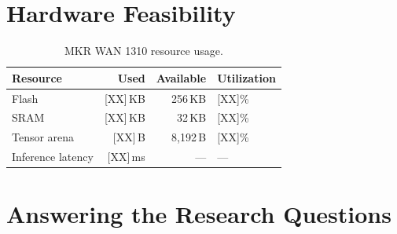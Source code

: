 

\section{Hardware Feasibility}
\label{sec:hardware-feasibility}

\begin{table}[H]
  \centering
  \caption{MKR WAN 1310 resource usage.}
  \label{tab:hw-resources}
  \begin{tabular}{lrrl}
    \toprule
    \textbf{Resource} & \textbf{Used} & \textbf{Available} & \textbf{Utilization} \\
    \midrule
    Flash              & [XX]\,KB  & 256\,KB   & [XX]\% \\
    SRAM               & [XX]\,KB  & 32\,KB    & [XX]\% \\
    Tensor arena       & [XX]\,B   & 8,192\,B  & [XX]\% \\
    Inference latency  & [XX]\,ms  & ---       & --- \\
    \bottomrule
  \end{tabular}
\end{table}

\section{Answering the Research Questions}
\label{sec:answer-rqs}



